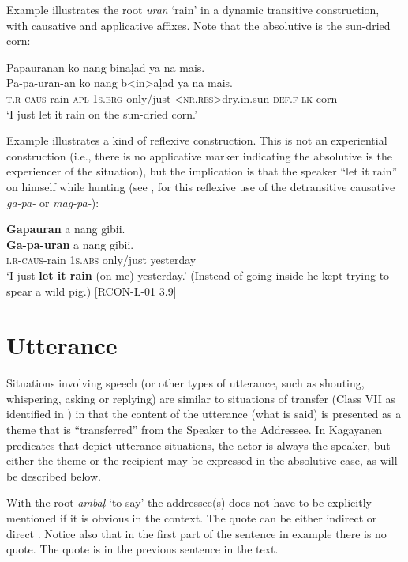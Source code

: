 Example  illustrates the root \textit{uran} ‘rain’ in a dynamic transitive construction, with causative and applicative affixes. Note that the absolutive is the sun-dried corn: 

\ea 
\label{bkm:Ref149029627}
Papauranan  ko  nang  binaļad  ya  na  mais. \\\smallskip
\gll Pa-pa-uran-an  ko  nang  b<in>aļad  ya  na  mais. \\
\textsc{t.r-caus}-rain-\textsc{apl}  1\textsc{s.erg}  only/just  <\textsc{nr.res}>dry.in.sun  \textsc{def.f}  \textsc{lk}  corn \\
\glt ‘I just let it rain on the sun-dried corn.’
\z  

Example  illustrates a kind of reflexive construction. This is not an experiential construction (i.e., there is no applicative marker indicating the absolutive is the experiencer of the situation), but the implication is that the speaker “let it rain” on himself while hunting (see ,  for this reflexive use of the detransitive causative \textit{ga-pa-} or \textit{mag-pa-}):

\ea 
\label{bkm:Ref149030144}
\textbf{Gapauran}  a  nang  gibii. \\\smallskip
\gll \textbf{Ga-pa-uran}  a  nang  gibii. \\
\textsc{i.r}-\textsc{caus}-rain  1\textsc{s.abs}  only/just  yesterday \\
\glt ‘I just \textbf{let it rain} (on me) yesterday.’ (Instead of going inside he kept trying to spear a wild pig.) [RCON-L-01 3.9]
\z

\section{Utterance}
\label{sec:utterance}

Situations involving speech (or other types of utterance, such as shouting, whispering, asking or replying) are similar to situations of transfer (Class VII as identified in ) in that the content of the utterance (what is said) is presented as a theme that is “transferred” from the Speaker to the Addressee. In Kagayanen predicates that depict utterance situations, the actor is always the speaker, but either the theme or the recipient may be expressed in the absolutive case, as will be described below.

With the root \textit{ambaļ} ‘to say’ the addressee(s) does not have to be explicitly mentioned if it is obvious in the context. The quote can be either indirect  or direct . Notice also that in the first part of the sentence in example  there is no quote. The quote is in the previous sentence in the text.

